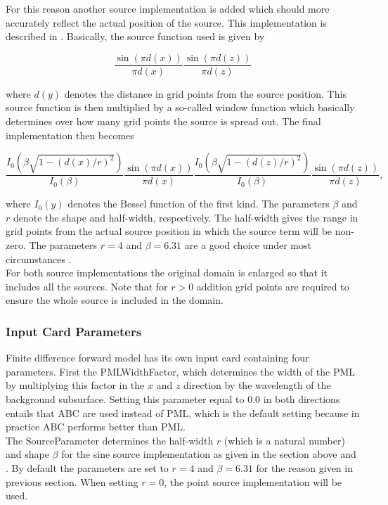 \documentclass[10pt,a4paper]{article}
\begin{document}
For this reason another source implementation is added which should more accurately reflect the actual position of the source. This implementation is described in \cite{Hicks}. Basically, the source function used is given by

\begin{equation}
	\frac{\sin(\pi d(x))}{\pi d(x)}\frac{\sin(\pi d(z))}{\pi d(z)}
\end{equation}

where $d(y)$ denotes the distance in grid points from the source position. This source function is then multiplied by a so-called window function which basically determines over how many grid points the source is spread out. The final implementation then becomes

\begin{equation}
	\frac{I_0(\beta \sqrt{1-(d(x)/r)^2})}{I_0(\beta)}\frac{\sin(\pi d(x))}{\pi d(x)}\frac{I_0(\beta \sqrt{1-(d(z)/r)^2})}{I_0(\beta)}\frac{\sin(\pi d(z))}{\pi d(z)},
\end{equation}

where $I_0(y)$ denotes the Bessel function of the first kind. The parameters $\beta$ and $r$ denote the shape and half-width, respectively. The half-width gives the range in grid points from the actual source position in which the source term will be non-zero. The parameters $r=4$ and $\beta=6.31$ are a good choice under most circumstances \cite{Hicks}.\\

For both source implementations the original domain is enlarged so that it includes all the sources. Note that for $r>0$ addition grid points are required to ensure the whole source is included in the domain.

\subsubsection{Input Card Parameters} \label{sec:FDimplementation}
Finite difference forward model has its own input card containing four parameters. First the PMLWidthFactor, which determines the width of the PML by multiplying this factor in the $x$ and $z$ direction by the wavelength of the background subsurface. Setting this parameter equal to $0.0$ in both directions entails that ABC are used instead of PML, which is the default setting because in practice ABC performs better than PML.\\

The SourceParameter determines the half-width $r$ (which is a natural number) and shape $\beta$ for the sine source implementation as given in the section above and \cite{Hicks}. By default the parameters are set to $r=4$ and $\beta=6.31$ for the reason given in previous section. When setting $r=0$, the point source implementation will be used.
\end{document}
